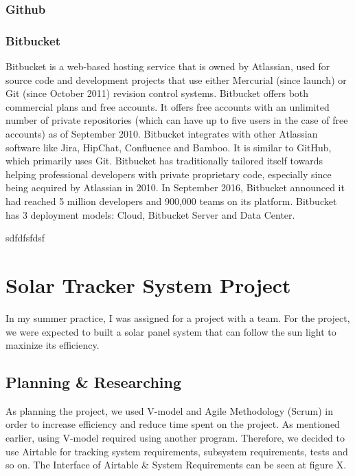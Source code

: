 \subsubsection{Github}

\subsubsection{Bitbucket}

Bitbucket is a web-based hosting service that is owned by Atlassian, used for source code and development projects that use either Mercurial (since launch) or Git (since October 2011) revision control systems. Bitbucket offers both commercial plans and free accounts. It offers free accounts with an unlimited number of private repositories (which can have up to five users in the case of free accounts) as of September 2010. Bitbucket integrates with other Atlassian software like Jira, HipChat, Confluence and Bamboo.
It is similar to GitHub, which primarily uses Git. Bitbucket has traditionally tailored itself towards helping professional developers with private proprietary code, especially since being acquired by Atlassian in 2010. In September 2016, Bitbucket announced it had reached 5 million developers and 900,000 teams on its platform. Bitbucket has 3 deployment models: Cloud, Bitbucket Server and Data Center.

sdfdfsfdsf




\section{Solar Tracker System Project }
\-
\indent In my summer practice, I was assigned for a project with a team. For the project, we were expected to built a solar panel system that can follow the sun light to maxinize its efficiency. 

\subsection{Planning \& Researching}
\-
\indent As planning the project, we used V-model and Agile Methodology (Scrum) in order to increase efficiency and reduce time spent on the project. As mentioned earlier, using V-model required using another program. Therefore, we decided to use Airtable for tracking system requirements, subsystem requirements, tests and so on. The Interface of Airtable \& System Requirements can be seen at figure X.


